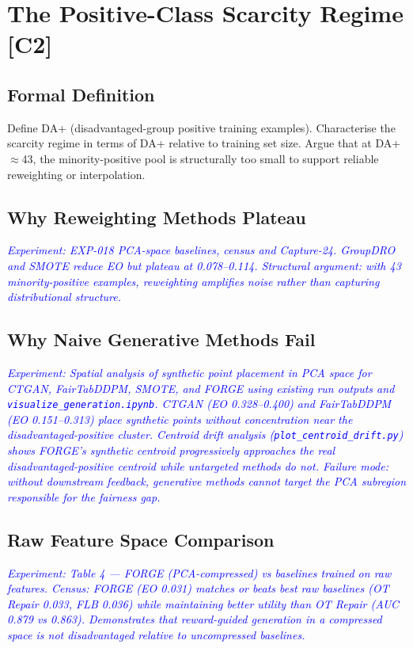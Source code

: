 \documentclass[12pt]{article}
\newcommand{\experiment}[1]{\textcolor{blue}{\textit{Experiment: #1}}}
\newcommand{\contrib}[1]{\textbf{[#1]}}
\begin{document}
\section{The Positive-Class Scarcity Regime \contrib{C2}}

\subsection{Formal Definition}
Define DA+ (disadvantaged-group positive training examples). Characterise the
scarcity regime in terms of DA+ relative to training set size. Argue that at
DA+$\approx$43, the minority-positive pool is structurally too small to
support reliable reweighting or interpolation.

\subsection{Why Reweighting Methods Plateau}
\experiment{EXP-018 PCA-space baselines, census and Capture-24. GroupDRO and
SMOTE reduce EO but plateau at 0.078--0.114. Structural argument: with 43
minority-positive examples, reweighting amplifies noise rather than capturing
distributional structure.}

\subsection{Why Naive Generative Methods Fail}
\experiment{Spatial analysis of synthetic point placement in PCA space for
CTGAN, FairTabDDPM, SMOTE, and FORGE using existing run outputs and
\texttt{visualize\_generation.ipynb}. CTGAN (EO 0.328--0.400) and FairTabDDPM
(EO 0.151--0.313) place synthetic points without concentration near the
disadvantaged-positive cluster. Centroid drift analysis
(\texttt{plot\_centroid\_drift.py}) shows FORGE's synthetic centroid
progressively approaches the real disadvantaged-positive centroid while
untargeted methods do not. Failure mode: without downstream feedback,
generative methods cannot target the PCA subregion responsible for the
fairness gap.}

\subsection{Raw Feature Space Comparison}
\experiment{Table 4 --- FORGE (PCA-compressed) vs baselines trained on raw
features. Census: FORGE (EO 0.031) matches or beats best raw baselines (OT
Repair 0.033, FLB 0.036) while maintaining better utility than OT Repair (AUC
0.879 vs 0.863). Demonstrates that reward-guided generation in a compressed
space is not disadvantaged relative to uncompressed baselines.}
\end{document}
